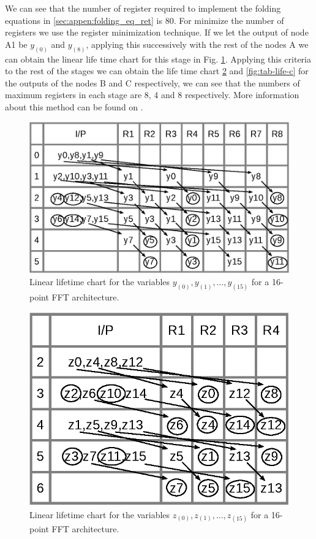 \documentclass[journal,comsoc]{IEEEtran}
\begin{document}
We can see that the number of register required to implement the folding equations in \ref{sec:appen:folding_eq_ret} is 80. For minimize the number of registers we use the register minimization technique. 
If we let the output of node A1 be $y_{(0)}$ and $y_{(8)}$, applying this successively with the rest of the nodes A we can obtain the linear life time chart for this stage in Fig. \ref{fig:tab-life-a}. Applying this criteria to the rest of the stages we can obtain the life time chart \ref{fig:tab-life-b} and \ref{fig:tab-life-c} for the outputs of the nodes B and C respectively, we can see that the numbers of maximum registers in each stage are 8, 4 and 8 respectively. More information about this method can be found on \cite{pipeline_parhi_book}.

\begin{figure}[htbp]%
\centering
 \includegraphics[width=\linewidth]{Diagramas/tab_life_a.eps}%
\caption{Linear lifetime chart for the variables $y_{(0)}, y_{(1)},...,y_{(15)}$ for a 16-point FFT architecture.}
\label{fig:tab-life-a}
\end{figure}

\begin{figure}[htbp]%
\centering
 \includegraphics[width=0.7\linewidth]{Diagramas/tab_life_b.eps}%
\caption{Linear lifetime chart for the variables $z_{(0)}, z_{(1)},...,z_{(15)}$ for a 16-point FFT architecture.}
\label{fig:tab-life-b}
\end{figure}
\end{document}
